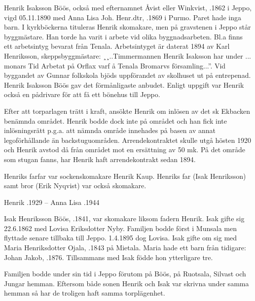 Henrik Isaksson Böös, också med efternamnet Åvist eller Winkvist, .1862 i Jeppo, vigd 05.11.1890 med Anna Lisa Joh. Henr.dtr, .1869 i Purmo. Paret hade inga barn. I kyrkböckerna tituleras Henrik skomakare, men på gravstenen i Jeppo står byggmästare. Han torde ha varit i arbete vid olika byggnadsarbeten. Bl.a finns ett arbetsintyg bevarat från Tenala. Arbetsintyget är daterat 1894 av Karl Henriksson, skeppsbyggmästare: ¸¸..Timmermannen Henrik Isaksson har under ... monars Tid Arbetat på Orflax varf å Tenala Bromarvs församling...''. Vid byggandet av Gunnar folkskola bjöds uppförandet av skolhuset ut på entrepenad. Henrik Isaksson Böös gav det förmånligaste anbudet. Enligt uppgift var Henrik också en pådrivare för att få ett bönehus till Jeppo.

Efter att torparlagen trätt i kraft, ansökte Henrik om inlösen av det sk Ekbacken benämnda området. Henrik bodde dock inte på området och han fick inte inlösningsrätt p.g.a. att nämnda område innehades på basen av annat legoförhållande än backstuguområden. Arrendekontraktet skulle utgå hösten 1920 och Henrik avstod då från området mot en ersättning av 50 mk. På det område som stugan fanns, har Henrik haft arrendekontrakt sedan 1894.

Henriks farfar var sockenskomakare Henrik Kaup. Henriks far (Isak Henriksson) samt bror (Erik Nyqvist) var också skomakare.

Henrik .1929  --  Anna Lisa .1944


Isak Henriksson Böös, .1841, var skomakare liksom fadern Henrik. Isak gifte sig 22.6.1862 med Lovisa Eriksdotter Nyby. Familjen bodde först i Munsala men flyttade senare tillbaka till Jeppo. 1.4.1895 dog Lovisa. Isak gifte om sig med Maria Henriksdotter 			Ojala, .1843 på Mietala. Maria hade ett barn från tidigare: Johan Jakob, .1876. Tillsammans med Isak födde hon ytterligare tre.
\begin{jhchildren}
  \item {}
  \item {}
  \item {}
\end{jhchildren}
Familjen bodde under sin tid i Jeppo förutom på Böös, på Ruotsala, Silvast och Jungar hemman. Eftersom både sonen Henrik och Isak var skrivna under samma hemman så har de troligen haft samma torplägenhet.

